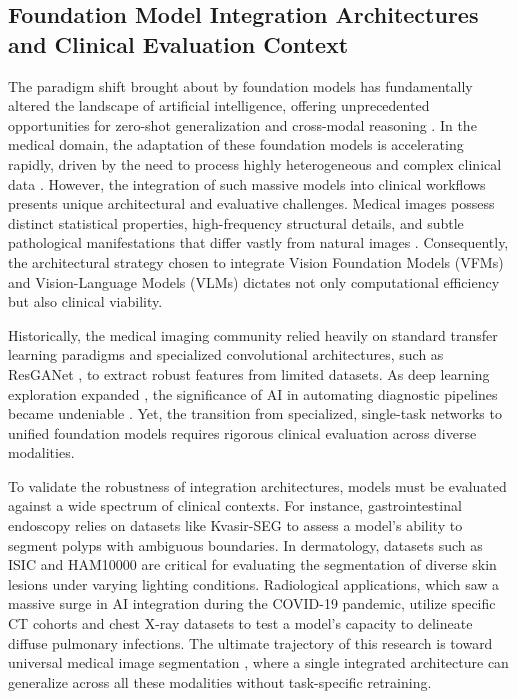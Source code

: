 \documentclass[onecolumn]{IEEEtran}
\numberwithin{equation}{section}
\theoremstyle{definition}
\theoremstyle{remark}
\begin{document}
\subsection{Foundation Model Integration Architectures and Clinical Evaluation Context}

The paradigm shift brought about by foundation models has fundamentally altered the landscape of artificial intelligence, offering unprecedented opportunities for zero-shot generalization and cross-modal reasoning \cite{bommasani2022opportunities}. In the medical domain, the adaptation of these foundation models is accelerating rapidly, driven by the need to process highly heterogeneous and complex clinical data \cite{lee2024foundation}. However, the integration of such massive models into clinical workflows presents unique architectural and evaluative challenges. Medical images possess distinct statistical properties, high-frequency structural details, and subtle pathological manifestations that differ vastly from natural images \cite{wang2023images}. Consequently, the architectural strategy chosen to integrate Vision Foundation Models (VFMs) and Vision-Language Models (VLMs) dictates not only computational efficiency but also clinical viability.

Historically, the medical imaging community relied heavily on standard transfer learning paradigms \cite{lee2018pre} and specialized convolutional architectures, such as ResGANet \cite{cheng2022resganet}, to extract robust features from limited datasets. As deep learning exploration expanded \cite{rahman2021exploring}, the significance of AI in automating diagnostic pipelines became undeniable \cite{manikandan2024significance}. Yet, the transition from specialized, single-task networks to unified foundation models requires rigorous clinical evaluation across diverse modalities. 

To validate the robustness of integration architectures, models must be evaluated against a wide spectrum of clinical contexts. For instance, gastrointestinal endoscopy relies on datasets like Kvasir-SEG \cite{jha2020kvasir} to assess a model's ability to segment polyps with ambiguous boundaries. In dermatology, datasets such as ISIC \cite{codella2018skin} and HAM10000 \cite{tschandl2018ham10000} are critical for evaluating the segmentation of diverse skin lesions under varying lighting conditions. Radiological applications, which saw a massive surge in AI integration during the COVID-19 pandemic, utilize specific CT cohorts \cite{konya2020ct} and chest X-ray datasets \cite{chowdhury2020can} to test a model's capacity to delineate diffuse pulmonary infections. The ultimate trajectory of this research is toward universal medical image segmentation \cite{butoi2023universeg}, where a single integrated architecture can generalize across all these modalities without task-specific retraining.
\end{document}
